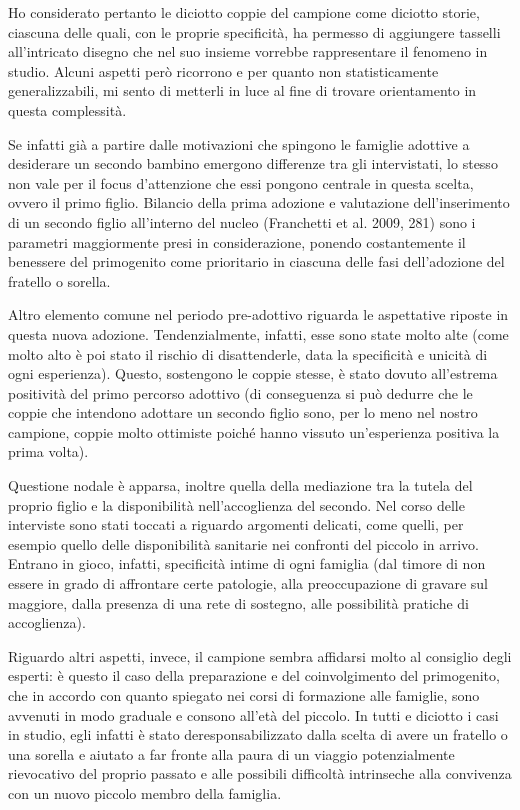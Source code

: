 \documentclass[12pt,oneside,svgnames]{memoir}
\begin{document}
Ho considerato pertanto le diciotto coppie del campione come diciotto
storie, ciascuna delle quali, con le proprie specificità, ha permesso di
aggiungere tasselli all'intricato disegno che nel suo insieme vorrebbe
rappresentare il fenomeno in studio. Alcuni aspetti però ricorrono e per
quanto non statisticamente generalizzabili, mi sento di metterli in luce
al fine di trovare orientamento in questa complessità.

Se infatti già a partire dalle motivazioni che spingono le famiglie
adottive a desiderare un secondo bambino emergono differenze tra gli
intervistati, lo stesso non vale per il focus d'attenzione che essi
pongono centrale in questa scelta, ovvero il primo figlio. Bilancio
della prima adozione e valutazione dell'inserimento di un secondo figlio
all'interno del nucleo (Franchetti et al. 2009, 281) sono i parametri
maggiormente presi in considerazione, ponendo costantemente il benessere
del primogenito come prioritario in ciascuna delle fasi dell'adozione
del fratello o sorella.

Altro elemento comune nel periodo pre-adottivo riguarda le aspettative
riposte in questa nuova adozione. Tendenzialmente, infatti, esse sono
state molto alte (come molto alto è poi stato il rischio di
disattenderle, data la specificità e unicità di ogni esperienza).
Questo, sostengono le coppie stesse, è stato dovuto all'estrema
positività del primo percorso adottivo (di conseguenza si può dedurre
che le coppie che intendono adottare un secondo figlio sono, per lo meno
nel nostro campione, coppie molto ottimiste poiché hanno vissuto
un'esperienza positiva la prima volta).

Questione nodale è apparsa, inoltre quella della mediazione tra la
tutela del proprio figlio e la disponibilità nell'accoglienza del
secondo. Nel corso delle interviste sono stati toccati a riguardo
argomenti delicati, come quelli, per esempio quello delle disponibilità
sanitarie nei confronti del piccolo in arrivo. Entrano in gioco,
infatti, specificità intime di ogni famiglia (dal timore di non essere
in grado di affrontare certe patologie, alla preoccupazione di gravare
sul maggiore, dalla presenza di una rete di sostegno, alle possibilità
pratiche di accoglienza).

Riguardo altri aspetti, invece, il campione sembra affidarsi molto al
consiglio degli esperti: è questo il caso della preparazione e del
coinvolgimento del primogenito, che in accordo con quanto spiegato nei
corsi di formazione alle famiglie, sono avvenuti in modo graduale e
consono all'età del piccolo. In tutti e diciotto i casi in studio, egli
infatti è stato deresponsabilizzato dalla scelta di avere un fratello o
una sorella e aiutato a far fronte alla paura di un viaggio
potenzialmente rievocativo del proprio passato e alle possibili
difficoltà intrinseche alla convivenza con un nuovo piccolo membro della
famiglia.
\end{document}
